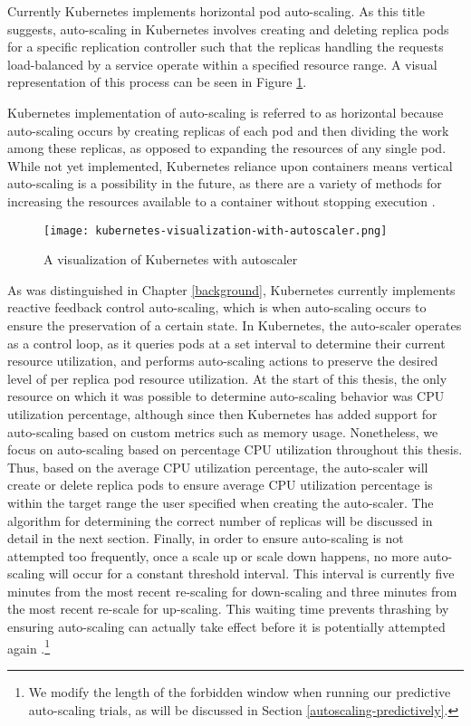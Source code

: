 Currently Kubernetes implements horizontal pod auto-scaling.
As this title suggests, auto-scaling in
Kubernetes involves creating and deleting replica pods for a specific replication
controller such that the replicas handling the requests load-balanced by a service
operate within a specified resource range. A visual representation of this
process can be seen in Figure \ref{fig:kubernetes-visualization-with-autoscaler}.

Kubernetes implementation of auto-scaling is referred to as horizontal because
auto-scaling occurs by creating replicas of each pod and then dividing the work
among these replicas, as opposed to expanding the resources of any single pod.
While not yet implemented, Kubernetes reliance upon containers means vertical
auto-scaling is a possibility in the future, as there are a variety of
methods for increasing the resources available to a container without stopping
execution \cite{docker-up-and-running}.

\begin{figure}[!h]
  \centerline{\texttt{[image: kubernetes-visualization-with-autoscaler.png]}}
  \caption{A visualization of Kubernetes with autoscaler}
  \label{fig:kubernetes-visualization-with-autoscaler}
\end{figure}

As was distinguished in Chapter \ref{background}, Kubernetes currently implements reactive
feedback control auto-scaling, which is when auto-scaling occurs to
ensure the preservation of a certain state.
In Kubernetes, the auto-scaler operates as a control loop,
as it queries pods at a set interval to determine
their current resource utilization, and performs auto-scaling actions to
preserve the desired level of per replica pod resource utilization.
At the start of this thesis, the only resource on which it was possible to
determine auto-scaling behavior was CPU utilization percentage, although since
then Kubernetes has added support for auto-scaling based on custom metrics such
as memory usage. Nonetheless, we focus on auto-scaling based on percentage CPU
utilization throughout this thesis.
Thus, based on the average CPU utilization percentage, the
auto-scaler will create or delete replica pods to ensure average CPU utilization
percentage is within the target range the user specified when creating the
auto-scaler. The algorithm for determining the correct number of replicas
will be discussed in detail in the next section. Finally,
in order to ensure auto-scaling is not attempted too frequently, once a
scale up or scale down happens, no more auto-scaling will occur for a constant
threshold interval. This interval is currently five minutes from the most recent
re-scaling for down-scaling and three minutes from the most recent re-scale for
up-scaling. This waiting time prevents thrashing by ensuring
auto-scaling can actually take effect before it is potentially attempted again
\cite{k8s-horizontal-pod-autoscaler-user-guide}.\footnote{We modify the length
of the forbidden window when running our predictive auto-scaling trials, as will
be discussed in Section \ref{autoscaling-predictively}.}

